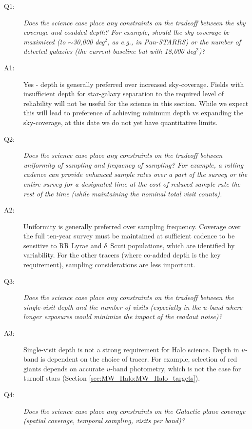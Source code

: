  \begin{description}

 \item[Q1:] {\it Does the science case place any constraints on the
 tradeoff between the sky coverage and coadded depth? For example, should
 the sky coverage be maximized (to $\sim$30,000 deg$^2$, as e.g., in
 Pan-STARRS) or the number of detected galaxies (the current baseline but
 with 18,000 deg$^2$)?}

\item[A1:] Yes - depth is generally preferred over increased
  sky-coverage. Fields with insufficient depth for star-galaxy
  separation to the required level of reliability will not be useful
  for the science in this section. While we expect this will lead to
  preference of achieving minimum depth vs expanding the sky-coverage,
  at this date we do not yet have quantitative limits.

 \item[Q2:] {\it Does the science case place any constraints on the
 tradeoff between uniformity of sampling and frequency of  sampling? For
 example, a rolling cadence can provide enhanced sample rates over a part
 of the survey or the entire survey for a designated time at the cost of
 reduced sample rate the rest of the time (while maintaining the nominal
 total visit counts).}

\item[A2:] Uniformity is generally preferred over sampling frequency. Coverage over the full ten-year survey must be maintained at sufficient cadence to be sensitive to RR Lyrae and $\delta$~Scuti populations, which are identified by variability. For the other tracers (where co-added depth is the key requirement), sampling considerations are less important.

 \item[Q3:] {\it Does the science case place any constraints on the
 tradeoff between the single-visit depth and the number of visits
 (especially in the $u$-band where longer exposures would minimize the
 impact of the readout noise)?}

\item[A3:] Single-visit depth is not a strong requirement for Halo science. Depth in $u$-band is dependent on the choice of tracer. For example, selection of red giants depends on accurate $u$-band photometry, which is not the case for turnoff stars (Section \ref{sec:MW_Halo:MW_Halo_targets}).

 \item[Q4:] {\it Does the science case place any constraints on the
 Galactic plane coverage (spatial coverage, temporal sampling, visits per
 band)?}


\end{description}
